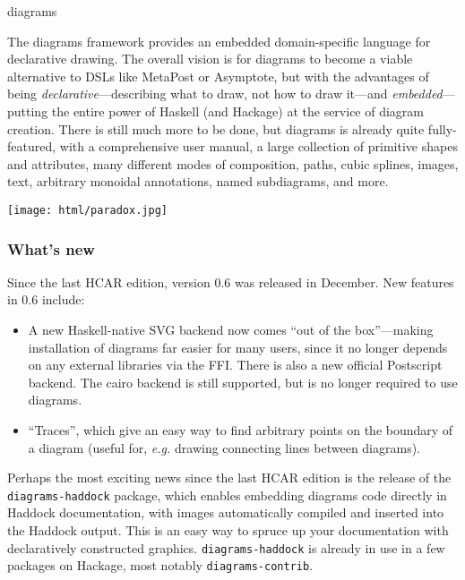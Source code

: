 \documentclass{article}
\begin{document}
\begin{hcarentry}[updated]{diagrams}
\makeheader

The diagrams framework provides an embedded domain-specific language
for declarative drawing.  The overall vision is for diagrams to become
a viable alternative to DSLs like MetaPost or Asymptote, but with the
advantages of being \emph{declarative}---describing what to draw, not
how to draw it---and \emph{embedded}---putting the entire power of
Haskell (and Hackage) at the service of diagram creation.  There is
still much more to be done, but diagrams is already quite
fully-featured, with a comprehensive user manual, a large collection
of primitive shapes and attributes, many different modes of
composition, paths, cubic splines, images, text, arbitrary monoidal
annotations, named subdiagrams, and more.

\begin{center}
\texttt{[image: html/paradox.jpg]}
\end{center}

\subsubsection*{What's new}

Since the last HCAR edition, version 0.6 was released in December.
New features in 0.6 include:
\begin{itemize}
\item A new Haskell-native SVG backend now comes ``out of the
  box''---making installation of diagrams far easier for many users,
  since it no longer depends on any external libraries via the
  FFI. There is also a new official Postscript backend.  The cairo
  backend is still supported, but is no longer required to use
  diagrams.
\item ``Traces'', which give an easy way to find arbitrary points on
  the boundary of a diagram (useful for, \emph{e.g.} drawing
  connecting lines between diagrams).
\end{itemize}

Perhaps the most exciting news since the last HCAR edition is the
release of the \texttt{diagrams-haddock} package, which enables
embedding diagrams code directly in Haddock documentation, with images
automatically compiled and inserted into the Haddock output.  This is
an easy way to spruce up your documentation with declaratively
constructed graphics.  \texttt{diagrams-haddock} is already in use
in a few packages on Hackage, most notably \texttt{diagrams-contrib}.


\end{hcarentry}
\end{document}
